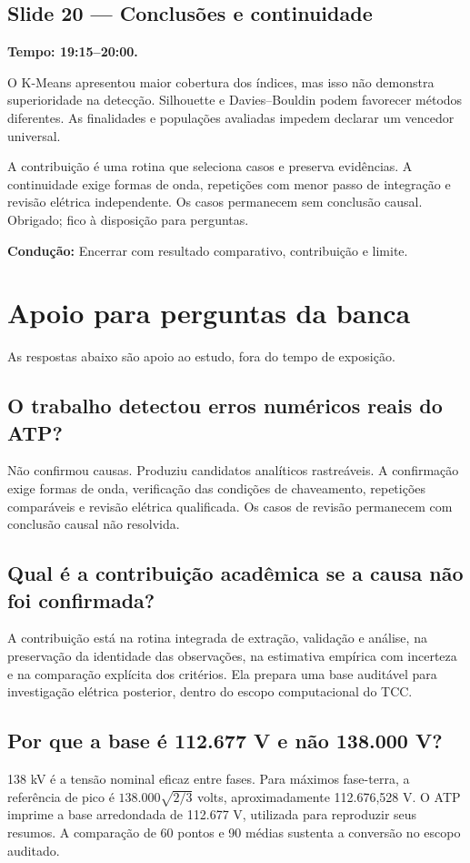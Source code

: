 \documentclass[11pt,a4paper]{article}
\newcommand{\slide}[3]{\Needspace{8\baselineskip}
  \subsection*{Slide #1 --- #2}
  \textbf{Tempo: #3.}\par}
\newcommand{\cue}[1]{\par{\small\color{accent}\textbf{Condução:} #1}\par}
\begin{document}
\slide{20}{Conclusões e continuidade}{19:15--20:00}
O K-Means apresentou maior cobertura dos índices, mas isso não demonstra superioridade na detecção. Silhouette e Davies--Bouldin podem favorecer métodos diferentes. As finalidades e populações avaliadas impedem declarar um vencedor universal.

A contribuição é uma rotina que seleciona casos e preserva evidências. A continuidade exige formas de onda, repetições com menor passo de integração e revisão elétrica independente. Os casos permanecem sem conclusão causal. Obrigado; fico à disposição para perguntas.
\cue{Encerrar com resultado comparativo, contribuição e limite.}

\section*{Apoio para perguntas da banca}

As respostas abaixo são apoio ao estudo, fora do tempo de exposição.

\subsection*{O trabalho detectou erros numéricos reais do ATP?}
Não confirmou causas. Produziu candidatos analíticos rastreáveis.
A confirmação exige formas de onda, verificação das condições de
chaveamento, repetições comparáveis e revisão elétrica qualificada.
Os casos de revisão permanecem com conclusão causal não resolvida.

\subsection*{Qual é a contribuição acadêmica se a causa não foi confirmada?}
A contribuição está na rotina integrada de extração, validação e análise,
na preservação da identidade das observações, na estimativa empírica
com incerteza e na comparação explícita dos critérios. Ela prepara uma
base auditável para investigação elétrica posterior, dentro do escopo
computacional do TCC.

\subsection*{Por que a base é 112.677 V e não 138.000 V?}
138 kV é a tensão nominal eficaz entre fases. Para máximos fase-terra,
a referência de pico é $138.000\sqrt{2/3}$ volts, aproximadamente
112.676,528 V. O ATP imprime a base arredondada de 112.677 V, utilizada
para reproduzir seus resumos. A comparação de 60 pontos e 90 médias
sustenta a conversão no escopo auditado.
\end{document}
